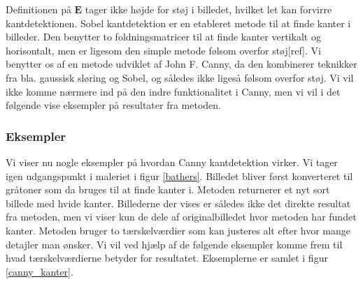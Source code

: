 {Definitionen på $\mathbf{E}$ tager ikke højde for støj i billedet,
hvilket let kan forvirre kantdetektionen. Sobel kantdetektion er en
etableret metode til at finde kanter i billeder. Den benytter to
foldningsmatricer til at finde kanter vertikalt og horisontalt, men er
ligesom den simple metode følsom overfor støj[ref]. Vi benytter os af en
metode udviklet af John F. Canny, da den kombinerer teknikker fra bla.
gaussisk sløring og Sobel\cite{SIOlsen}, og således ikke ligeså følsom overfor
støj. Vi vil ikke komme nærmere ind på den indre funktionalitet i Canny,
men vi vil i det følgende vise eksempler på resultater fra metoden.

\subsubsection*{Eksempler}
Vi viser nu nogle eksempler på hvordan Canny kantdetektion virker. Vi
tager igen udgangspunkt i maleriet i figur \ref{bathers}. Billedet
bliver først konverteret til gråtoner som da bruges til at finde kanter
i. Metoden returnerer et nyt sort billede med hvide kanter. Billederne
der vises er således ikke det direkte resultat fra metoden, men vi viser
kun de dele af originalbilledet hvor metoden har fundet kanter. Metoden
bruger to tærskelværdier som kan justeres alt efter hvor mange detajler
man ønsker. Vi vil ved hjælp af de følgende eksempler komme frem til
hvad tærskelværdierne betyder for resultatet. Eksemplerne er samlet i
figur \ref{canny_kanter}.

}
